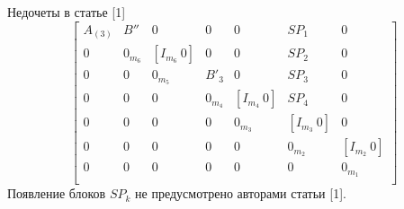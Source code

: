 \documentclass[10pt,pdf,hyperref={unicode}]{beamer}
\begin{document}
\begin{frame}{Недочеты в статье [1]}
    \begin{equation*}
        \begin{bmatrix}
            A_{(3)} & B'' & 0 & 0 & 0 & SP_1 & 0 \\
            0 & 0_{m_6} & [I_{m_6}~0] & 0 & 0 & SP_2 & 0 \\
            0 & 0 & 0_{m_5} & B'_3 & 0 & SP_3 & 0 \\
            0 & 0 & 0 & 0_{m_4} & [I_{m_4}~0] & SP_4 & 0 \\
            0 & 0 & 0 & 0 & 0_{m_3} & [I_{m_3}~0] & 0 \\
            0 & 0 & 0 & 0 & 0 & 0_{m_2} & [I_{m_2}~0] \\
            0 & 0 & 0 & 0 & 0 & 0 & 0_{m_1} \\
        \end{bmatrix}
    \end{equation*}
    \newline
    Появление блоков $SP_k$ не предусмотрено авторами статьи [1].
\end{frame}
\end{document}

